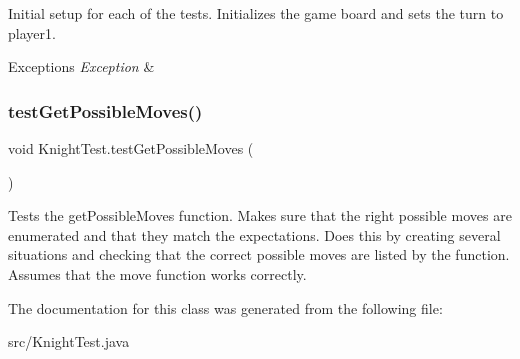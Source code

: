 Initial setup for each of the tests. Initializes the game board and sets the turn to player1. 
\begin{DoxyExceptions}{Exceptions}
{\em Exception} & \\
\hline
\end{DoxyExceptions}
\mbox{\label{class_knight_test_a165adb4b4b39b57ea73dce413accecdf}} 
\subsubsection{\texorpdfstring{test\+Get\+Possible\+Moves()}{testGetPossibleMoves()}}
{\footnotesize\ttfamily void Knight\+Test.\+test\+Get\+Possible\+Moves (\begin{DoxyParamCaption}{ }\end{DoxyParamCaption})}

Tests the get\+Possible\+Moves function. Makes sure that the right possible moves are enumerated and that they match the expectations. Does this by creating several situations and checking that the correct possible moves are listed by the function. Assumes that the move function works correctly. 

The documentation for this class was generated from the following file\+:\begin{DoxyCompactItemize}
\item 
src/Knight\+Test.\+java\end{DoxyCompactItemize}
